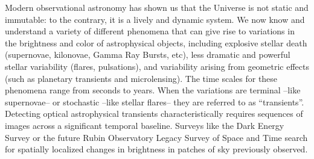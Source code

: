 




Modern observational astronomy has shown us that the Universe is not static and immutable: to the contrary, it is a lively and dynamic system. We now know and understand a variety of different phenomena that can give rise to variations in the brightness and color of astrophysical objects, including explosive stellar death (supernovae, kilonovae, Gamma Ray Bursts, etc), less dramatic and powerful stellar variability (flares, pulsations), and variability arising from geometric effects (such as planetary transients and microlensing). The time scales for these phenomena range from seconds to years. When the variations are terminal –like supernovae– or stochastic –like stellar flares– they are referred to as ``transients''. 
Detecting optical astrophysical transients characteristically requires sequences of images across a significant temporal baseline. Surveys like the Dark Energy Survey \citep[DES]{DES} or the future Rubin Observatory Legacy Survey of Space and Time \citep[LSST]{lsst} search for spatially localized changes in brightness in patches of sky previously observed. 

